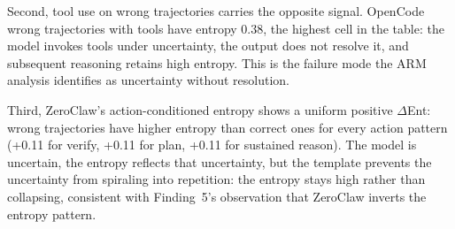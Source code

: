 Second, tool use on wrong trajectories carries the opposite signal.
OpenCode wrong trajectories with tools have entropy 0.38, the highest cell in
the table: the model invokes tools under uncertainty, the output does not
resolve it, and subsequent reasoning retains high entropy.
This is the failure mode the ARM analysis identifies as uncertainty without
resolution.

Third, ZeroClaw's action-conditioned entropy shows a uniform positive
$\Delta$Ent: wrong trajectories have higher entropy than correct ones for every
action pattern (+0.11 for verify, +0.11 for plan, +0.11 for sustained reason).
The model is uncertain, the entropy reflects that uncertainty, but the template
prevents the uncertainty from spiraling into repetition: the entropy stays high
rather than collapsing, consistent with Finding~5's observation that ZeroClaw
inverts the entropy pattern.
